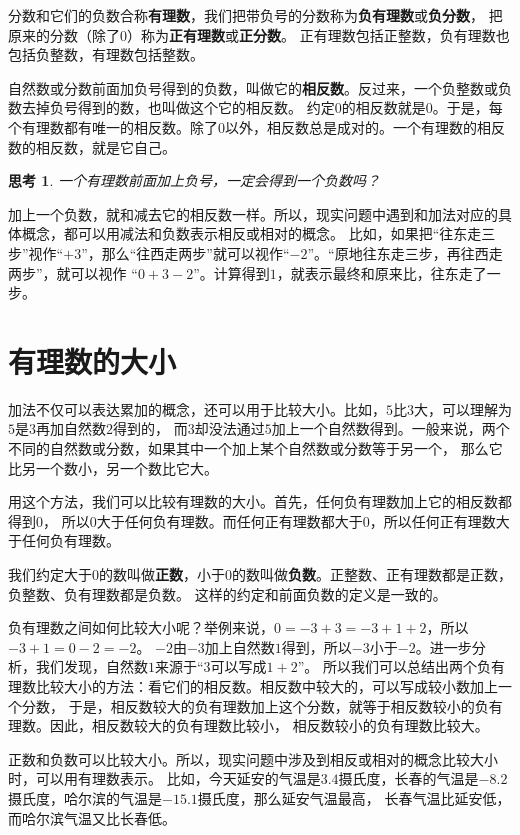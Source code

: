 \documentclass[12pt,UTF8]{ctexbook}
\newtheorem{sk}{思考}[section]
\begin{document}
分数和它们的负数合称\textbf{有理数}，我们把带负号的分数称为\textbf{负有理数}或\textbf{负分数}，
把原来的分数（除了$0$）称为\textbf{正有理数}或\textbf{正分数}。
正有理数包括正整数，负有理数也包括负整数，有理数包括整数。

自然数或分数前面加负号得到的负数，叫做它的\textbf{相反数}。反过来，一个负整数或负数去掉负号得到的数，也叫做这个它的相反数。
约定$0$的相反数就是$0$。于是，每个有理数都有唯一的相反数。除了$0$以外，相反数总是成对的。一个有理数的相反数的相反数，就是它自己。

\begin{sk}\label{sk:0-0-0}
    一个有理数前面加上负号，一定会得到一个负数吗？
\end{sk}

加上一个负数，就和减去它的相反数一样。所以，现实问题中遇到和加法对应的具体概念，都可以用减法和负数表示相反或相对的概念。
比如，如果把“往东走三步”视作“$+3$”，那么“往西走两步”就可以视作“$-2$”。“原地往东走三步，再往西走两步”，就可以视作
“$0+3-2$”。计算得到$1$，就表示最终和原来比，往东走了一步。

\section{有理数的大小}
加法不仅可以表达累加的概念，还可以用于比较大小。比如，$5$比$3$大，可以理解为$5$是$3$再加自然数$2$得到的，
而$3$却没法通过$5$加上一个自然数得到。一般来说，两个不同的自然数或分数，如果其中一个加上某个自然数或分数等于另一个，
那么它比另一个数小，另一个数比它大。

用这个方法，我们可以比较有理数的大小。首先，任何负有理数加上它的相反数都得到$0$，
所以$0$大于任何负有理数。而任何正有理数都大于$0$，所以任何正有理数大于任何负有理数。

我们约定大于$0$的数叫做\textbf{正数}，小于$0$的数叫做\textbf{负数}。正整数、正有理数都是正数，负整数、负有理数都是负数。
这样的约定和前面负数的定义是一致的。

负有理数之间如何比较大小呢？举例来说，$0 = -3 + 3 = -3 + 1 + 2$，所以$-3 + 1 = 0 - 2 = -2$。
$-2$由$-3$加上自然数$1$得到，所以$-3$小于$-2$。进一步分析，我们发现，自然数$1$来源于“$3$可以写成$1+2$”。
所以我们可以总结出两个负有理数比较大小的方法：看它们的相反数。相反数中较大的，可以写成较小数加上一个分数，
于是，相反数较大的负有理数加上这个分数，就等于相反数较小的负有理数。因此，相反数较大的负有理数比较小，
相反数较小的负有理数比较大。

正数和负数可以比较大小。所以，现实问题中涉及到相反或相对的概念比较大小时，可以用有理数表示。
比如，今天延安的气温是$3.4$摄氏度，长春的气温是$-8.2$摄氏度，哈尔滨的气温是$-15.1$摄氏度，那么延安气温最高，
长春气温比延安低，而哈尔滨气温又比长春低。
\end{document}

